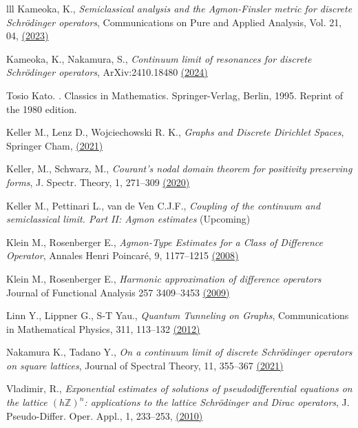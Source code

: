 \documentclass[12pt, reqno]{amsart}
\theoremstyle{definition}
\numberwithin{equation}{section}
\begin{document}
\begin{thebibliography}{lll}
Kameoka, K., \textit{Semiclassical analysis and the Agmon-Finsler metric for discrete Schr\"{o}dinger operators},
Communications on Pure and Applied Analysis, Vol. 21, 04, \href{https://doi.org/10.3934/cpaa.2023024}{(2023)}

  Kameoka, K., Nakamura, S., \textit{Continuum limit of resonances for discrete Schrödinger operators}, ArXiv:2410.18480 \href{https://doi.org/10.48550/arXiv.2410.18480}{(2024)}


Tosio Kato.
.
\newblock Classics in Mathematics. Springer-Verlag, Berlin, 1995.
\newblock Reprint of the 1980 edition.

Keller M., Lenz D., Wojciechowski R. K., \textit{Graphs and Discrete Dirichlet Spaces},
Springer Cham, \href{https://doi.org/10.1007/978-3-030-81459-5}{(2021)}

 Keller, M.,  Schwarz, M., \textit{Courant's nodal domain theorem for positivity preserving
              forms}, J. Spectr. Theory, 1, 271--309
\href{https://doi.org/10.4171/jst/292}{(2020)}

Keller M., Pettinari L., van de Ven C.J.F.,
\textit{Coupling of the continuum and semiclassical limit. Part II: Agmon estimates} (Upcoming) 

 Klein M., Rosenberger E., \textit{Agmon-Type Estimates for a Class of Difference Operator}, Annales Henri Poincar\'{e}, 9,  1177--1215 \href{https://doi.org/10.1007/s00023-008-0383-7}{(2008)}

  Klein M., Rosenberger E., \textit{Harmonic approximation of difference operators}
Journal of Functional Analysis 257  3409–3453 \href{https://doi.org/10.1016/j.jfa.2009.09.004}{(2009)}

 Linn Y., Lippner G., S-T Yau., \textit{Quantum Tunneling on Graphs},
Communications in Mathematical Physics, 311, 113--132 \href{https://doi.org/10.1007/s00220-012-1453-8}{(2012)}

 Nakamura K., Tadano Y., \textit{On a continuum limit of discrete Schr\"{o}dinger
operators on square lattices}, Journal of Spectral Theory, 11,  355--367 \href{https://doi.org/10.4171/jst/343}{(2021)}

 Vladimir, R., \textit{Exponential estimates of solutions of pseudodifferential
equations on the lattice $(h\mathbb{Z})^n$: applications to the lattice
Schrödinger and Dirac operators}, J. Pseudo-Differ. Oper. Appl., 1, 233--253, \href{10.1007/s11868-010-0005-2}{(2010)}


\end{thebibliography}
\end{document}
